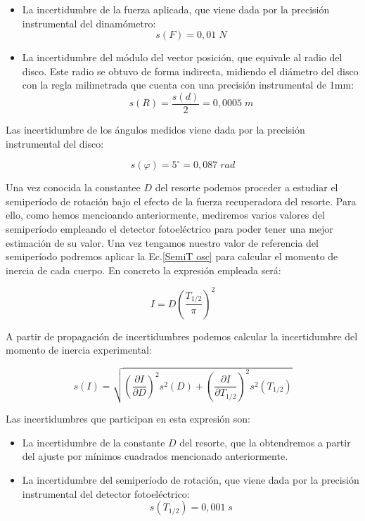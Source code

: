 \documentclass[a4paper,12pt,titlepage]{article}
\begin{document}
\begin{itemize}
    \item La incertidumbre de la fuerza aplicada, que viene dada por la precisión instrumental del dinamómetro:
    \begin{equation}
        s(F) = 0,01 \; N
    \end{equation}
    \item La incertidumbre del módulo del vector posición, que equivale al radio del disco. Este radio se obtuvo de forma indirecta, midiendo el diámetro del disco con la regla milimetrada que cuenta con una precisión instrumental de 1mm:
    \begin{equation}
        s(R) = \frac{s(d)}{2} = 0,0005 \; m
    \end{equation}
\end{itemize}

Las incertidumbre de los ángulos medidos viene dada por la precisión instrumental del disco:

\begin{equation}
    s(\varphi) = 5^\circ = 0,087 \;rad
\end{equation}

Una vez conocida la constantee $D$ del resorte podemos proceder a estudiar el semiperíodo de rotación bajo el efecto de la fuerza recuperadora del resorte. Para ello, como hemos mencioando anteriormente, mediremos varios valores del semiperíodo empleando el detector fotoeléctrico para poder tener una mejor estimación de su valor. Una vez tengamos nuestro valor de referencia del semiperíodo podremos aplicar la Ec.\ref{SemiT osc} para calcular el momento de inercia de cada cuerpo. En concreto la expresión empleada será:

\begin{equation}
    I = D \left (\frac{T_{1/2}}{\pi}\right )^2
    \label{Calculo MI figuras}
\end{equation}

A partir de propagación de incertidumbres podemos calcular la incertidumbre del momento de inercia experimental:

\begin{equation}
    s(I) = \sqrt{\left (\frac{\partial I}{\partial D}\right )^2s^2(D) + \left (\frac{\partial I}{\partial T_{1/2}}\right )^2s^2(T_{1/2})}
\end{equation}

Las incertidumbres que participan en esta expresión son:

\begin{itemize}
    \item La incertidumbre de la constante $D$ del resorte, que la obtendremos a partir del ajuste por mínimos cuadrados mencionado anteriormente.
    \item La incertidumbre del semiperíodo de rotación, que viene dada por la precisión instrumental del detector fotoeléctrico:
    \begin{equation}
        s(T_{1/2}) = 0,001 \;s
    \end{equation}
\end{itemize}
\end{document}
